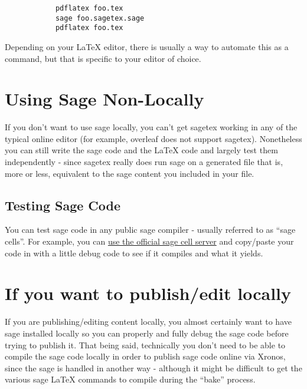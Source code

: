 \documentclass{ximera}
\begin{document}
        \begin{verbatim}
            pdflatex foo.tex
            sage foo.sagetex.sage
            pdflatex foo.tex
        \end{verbatim}
        Depending on your LaTeX editor, there is usually a way to automate this as a command, but that is specific to your editor of choice.
    
\section{Using Sage Non-Locally}
    
    If you don't want to use sage locally, you can't get sagetex working in any of the typical online editor (for example, overleaf does not support sagetex). Nonetheless you can still write the sage code and the LaTeX code and largely test them independently - since sagetex really does run sage on a generated file that is, more or less, equivalent to the sage content you included in your file.
    
    \subsection{Testing Sage Code}
        You can test sage code in any public sage compiler - usually referred to as ``sage cells''. For example, you can \href{https://sagecell.sagemath.org/}{use the official sage cell server} and copy/paste your code in with a little debug code to see if it compiles and what it yields.

\section{If you want to publish/edit locally}
    If you are publishing/editing content locally, you almost certainly want to have sage installed locally so you can properly and fully debug the sage code before trying to publish it. That being said, technically you don't need to be able to compile the sage code locally in order to publish sage code online via Xronos, since the sage is handled in another way - although it might be difficult to get the various sage LaTeX commands to compile during the ``bake'' process.
\end{document}
